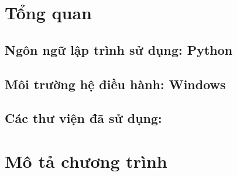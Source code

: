 \section{Tổng quan}
\subsection{Ngôn ngữ lập trình sử dụng: Python}
\subsection{Môi trường hệ điều hành: Windows}
\subsection{Các thư viện đã sử dụng:}


\section{Mô tả chương trình}
